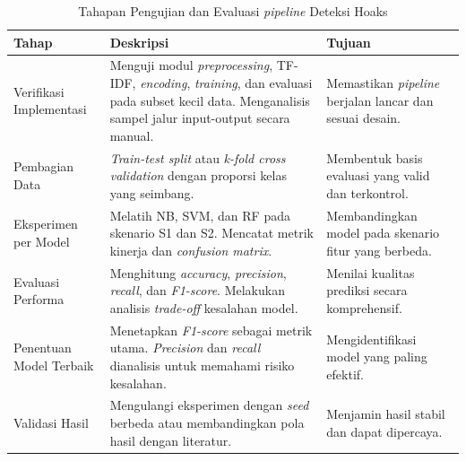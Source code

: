 \begin{table}[h!]
\centering
\begin{tabular}{| p{} | p{} | p{} |}
\hline
\textbf{Tahap} 
& \textbf{Deskripsi} 
& \textbf{Tujuan} \\
\hline

Verifikasi Implementasi
& Menguji modul \textit{preprocessing}, TF-IDF, \textit{encoding}, \textit{training}, dan evaluasi pada subset kecil data. Menganalisis sampel jalur input-output secara manual.
& Memastikan \textit{pipeline} berjalan lancar dan sesuai desain. \\
\hline

Pembagian Data
& \textit{Train-test split} atau \textit{k-fold cross validation} dengan proporsi kelas yang seimbang.
& Membentuk basis evaluasi yang valid dan terkontrol. \\
\hline

Eksperimen per Model
& Melatih NB, SVM, dan RF pada skenario S1 dan S2. Mencatat metrik kinerja dan \textit{confusion matrix}.
& Membandingkan model pada skenario fitur yang berbeda. \\
\hline

Evaluasi Performa
& Menghitung \textit{accuracy}, \textit{precision}, \textit{recall}, dan \textit{F1-score}. Melakukan analisis \textit{trade-off} kesalahan model.
& Menilai kualitas prediksi secara komprehensif. \\
\hline

Penentuan Model Terbaik
& Menetapkan \textit{F1-score} sebagai metrik utama. \textit{Precision} dan \textit{recall} dianalisis untuk memahami risiko kesalahan.
& Mengidentifikasi model yang paling efektif. \\
\hline

Validasi Hasil
& Mengulangi eksperimen dengan \textit{seed} berbeda atau membandingkan pola hasil dengan literatur.
& Menjamin hasil stabil dan dapat dipercaya. \\
\hline

\end{tabular}
\caption{Tahapan Pengujian dan Evaluasi \textit{pipeline} Deteksi Hoaks}
\label{tbl:pengujian-evaluasi}
\end{table}
